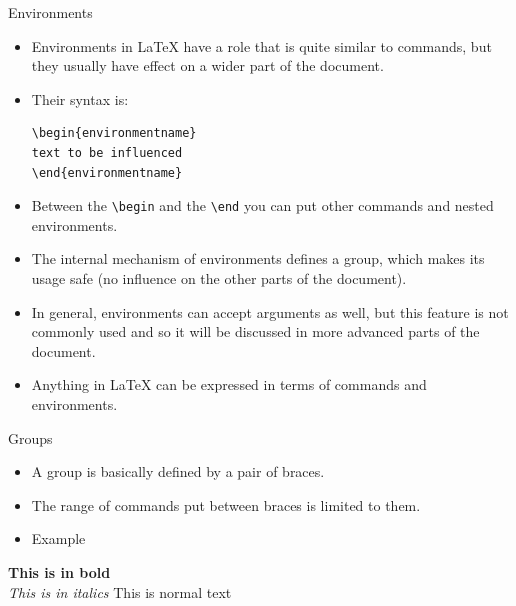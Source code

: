 \documentclass[style=lsuloni,orient=landscape]{powerdot}
\begin{document}
\begin{wideslide}[bm={Environments},method=direct]{Environments}
  \begin{itemize}
  \item Environments in LaTeX have a role that is quite similar to commands, but they usually have effect on a wider part of the document. 
  \item Their syntax is:
    \begin{lstlisting}
\begin{environmentname}
text to be influenced
\end{environmentname}
    \end{lstlisting}
  \item Between the \lstinline|\begin| and the \lstinline|\end| you can put other commands and nested environments. 
  \item The internal mechanism of environments defines a group, which makes its usage safe (no influence on the other parts of the document).
  \item In general, environments can accept arguments as well, but this feature is not commonly used and so it will be discussed in more advanced parts of the document.
  \item Anything in LaTeX can be expressed in terms of commands and environments.
  \end{itemize}	
\end{wideslide}

\begin{wideslide}[bm={Groups},method=direct]{Groups}
  \begin{itemize}
  \item A group is basically defined by a pair of braces.
  \item The range of commands put between braces is limited to them.
  \item Example
  \end{itemize}	
  \begin{LTXexample}[numbers=none,pos=b]
{\bf This is in bold}\\
{\em This is in italics}
This is normal text
  \end{LTXexample}
\end{wideslide}
\end{document}
